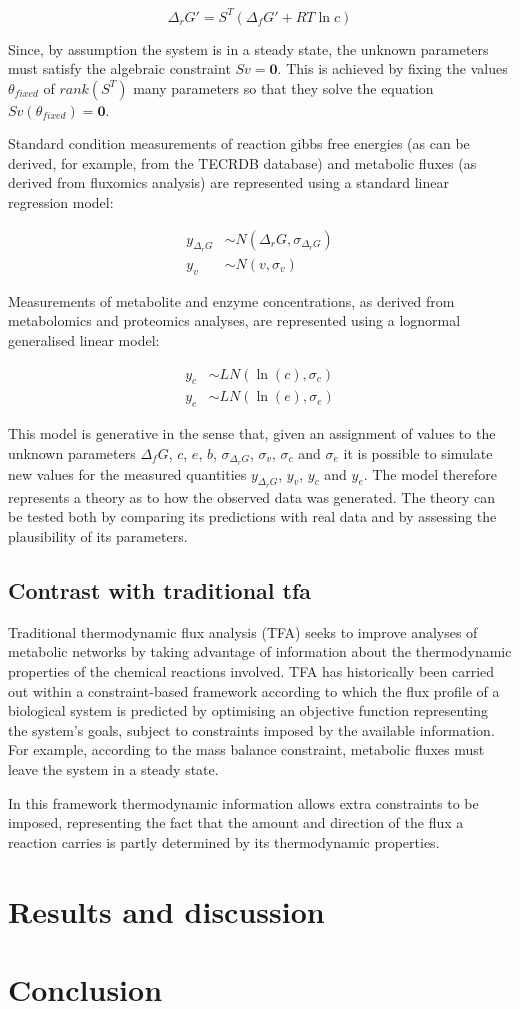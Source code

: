 \documentclass[11pt]{article}
\begin{document}
\[
\Delta_rG' = S^T(\Delta_fG' + RT\ln c)
\]

Since, by assumption the system is in a steady state, the unknown parameters
must satisfy the algebraic constraint $Sv = \mathbf{0}$. This is achieved by
fixing the values $\theta_{fixed}$ of $rank(S^T)$ many parameters so that they
solve the equation $Sv(\theta_{fixed}) = \mathbf{0}$.

Standard condition measurements of reaction gibbs free energies (as can be
derived, for example, from the TECRDB database) and metabolic fluxes (as
derived from fluxomics analysis) are represented using a standard linear
regression model:

\begin{align*}
	y_{\Delta_rG} &\sim N(\Delta_rG, \sigma_{\Delta_rG}) \\
	y_{v} &\sim N(v, \sigma_{v})
\end{align*}

Measurements of metabolite and enzyme concentrations, as derived from
metabolomics and proteomics analyses, are represented using a lognormal
generalised linear model:

\begin{align*}
	y_{c} & \sim LN(\ln(c), \sigma_{c}) \\
	y_{e} & \sim LN(\ln(e), \sigma_{e})
\end{align*}

This model is generative in the sense that, given an assignment of values to
the unknown parameters $\Delta_fG$, $c$, $e$, $b$, $\sigma_{\Delta_rG}$,
$\sigma_{v}$, $\sigma_c$ and $\sigma_{e}$ it is possible to simulate new values
for the measured quantities $y_{\Delta_rG}$, $y_v$, $y_c$ and $y_e$. The model
therefore represents a theory as to how the observed data was generated. The
theory can be tested both by comparing its predictions with real data and by
assessing the plausibility of its parameters.

\subsection{Contrast with traditional tfa}

Traditional thermodynamic flux analysis (TFA) seeks to improve analyses of
metabolic networks by taking advantage of information about the thermodynamic
properties of the chemical reactions involved. TFA has historically been
carried out within a constraint-based framework according to which the flux
profile of a biological system is predicted by optimising an objective function
representing the system's goals, subject to constraints imposed by the
available information. For example, according to the mass balance constraint,
metabolic fluxes must leave the system in a steady state.

In this framework thermodynamic information allows extra constraints to be
imposed, representing the fact that the amount and direction of the flux a
reaction carries is partly determined by its thermodynamic properties.

\section{Results and discussion}


\section{Conclusion}

\printbibliography
\end{document}
